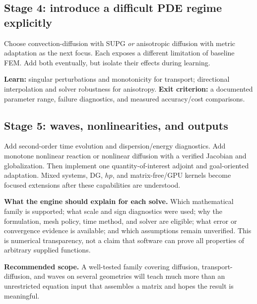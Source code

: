 \documentclass[11pt,a4paper]{article}
\begin{document}
\subsection{Stage 4: introduce a difficult PDE regime explicitly}
Choose convection-diffusion with SUPG \emph{or} anisotropic diffusion with metric adaptation as the next focus. Each exposes a different limitation of baseline FEM. Add both eventually, but isolate their effects during learning.

\textbf{Learn:} singular perturbations and monotonicity for transport; directional interpolation and solver robustness for anisotropy.\quad
\textbf{Exit criterion:} a documented parameter range, failure diagnostics, and measured accuracy/cost comparisons.

\subsection{Stage 5: waves, nonlinearities, and outputs}
Add second-order time evolution and dispersion/energy diagnostics. Add monotone nonlinear reaction or nonlinear diffusion with a verified Jacobian and globalization. Then implement one quantity-of-interest adjoint and goal-oriented adaptation. Mixed systems, DG, $hp$, and matrix-free/GPU kernels become focused extensions after these capabilities are understood.

\textbf{What the engine should explain for each solve.} Which mathematical family is supported; what scale and sign diagnostics were used; why the formulation, mesh policy, time method, and solver are eligible; what error or convergence evidence is available; and which assumptions remain unverified. This is numerical transparency, not a claim that software can prove all properties of arbitrary supplied functions.

\textbf{Recommended scope.} A well-tested family covering diffusion, transport-diffusion, and waves on several geometries will teach much more than an unrestricted equation input that assembles a matrix and hopes the result is meaningful.
\end{document}
